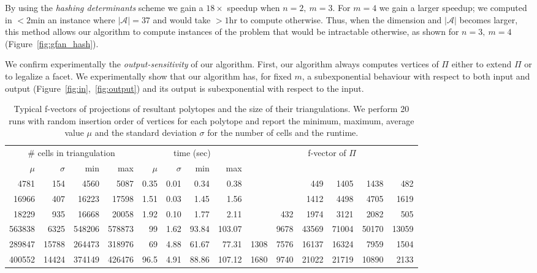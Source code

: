 \documentclass{article}
\def\A{{\mathcal A}} \def\R{{\mathcal R}}
\begin{document}
By using the {\it hashing determinants} scheme we gain a $18\times$ speed\-up 
when $n=2,\ m=3$.
For $m=4$ we gain a larger speedup; we computed in $<2$min an
instance where $|\A|=37$ and would take $>1$hr to compute
otherwise.
Thus, when the dimension and $|\A|$ becomes larger, this method allows our
algorithm to compute instances of the problem that would be intractable
otherwise, as shown for \(n=3,\ m=4\)  
(Figure~\ref{fig:gfan_hash}).

We confirm experimentally the \textit{output-sensitivity} of our algorithm. 
First, our algorithm always computes vertices of $\varPi$ either to extend
$\varPi$ or to legalize a facet.
We experimentally show that our algorithm has, for fixed $m$, a
subexponential behaviour with respect to both input and output
(Figure~\ref{fig:in},~\ref{fig:output}) and its output is
subexponential with respect to the input. 

\renewcommand{\tabcolsep}{0.165cm}
\begin{table}[t]\scriptsize
\begin{tabular}{@{}rrrr@{ }|rrrr@{ }|r@{ }r@{ }r@{ }r@{ }r@{ }r@{}}
\multicolumn{4}{c|}{\# cells in triangulation} &
        \multicolumn{4}{c|}{time (sec)} &
        \multicolumn{6}{c}{\multirow{2}{*}{f-vector of $\varPi$}}\\\cline{1-8}
$\mu$ & $\sigma$ & min & max & $\mu$ & $\sigma$ & min & max \\\hline
4781 & 154 & 4560 & 5087 & 0.35 & 0.01 & 0.34 & 0.38 & 
& & 449 & 1405 & 1438 & 482\\
16966 & 407 & 16223 & 17598 & 1.51 & 0.03 & 1.45 & 1.56 & 
& & 1412 & 4498 & 4705 & 1619\\\hline
18229 & 935 & 16668 & 20058 & 1.92 & 0.10 & 1.77 & 2.11 & 
& 432 & 1974 & 3121 & 2082 & 505\\
563838 & 6325 & 548206 & 578873 & 99 & 1.62 & 93.84 & 103.07 & 
& 9678 & 43569 & 71004 & 50170 & 13059\\\hline
289847 & 15788 & 264473 & 318976 & 69 & 4.88 & 61.67 & 77.31 & 
1308 & 7576 & 16137 & 16324 & 7959 & 1504\\
400552 & 14424 & 374149 & 426476 & 96.5 & 4.91 & 88.86 & 107.12 & 
1680 & 9740 & 21022 & 21719 & 10890 & 2133\\
\end{tabular}
\caption{Typical f-vectors of projections of resultant polytopes and the size of
their triangulations. We perform  20 runs with random
insertion order of vertices for each polytope and report the minimum, maximum,
average value $\mu$ and the standard deviation $\sigma$ for the number of cells
and the runtime.}
\label{tbl:triang_size}
\end{table}
\end{document}
